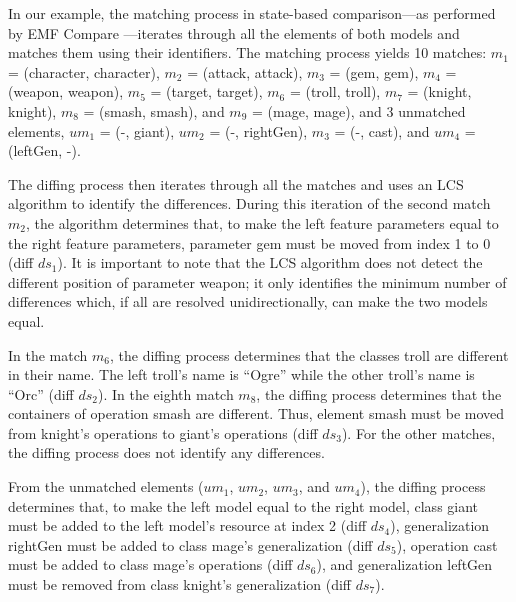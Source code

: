 In our example, the matching process in state-based comparison—as performed by EMF Compare \cite{emfcompare2018developer}—iterates through all the elements of both models and matches them using their identifiers. The matching process yields 10 matches: $m_1$ = (\textsf{character}, \textsf{character}), $m_2$ = (\textsf{attack}, \textsf{attack}), $m_3$ = (\textsf{gem}, \textsf{gem}), $m_4$ = (\textsf{weapon}, \textsf{weapon}), $m_5$ = (\textsf{target}, \textsf{target}), $m_6$ = (\textsf{troll}, \textsf{troll}), $m_7$ = (\textsf{knight}, \textsf{knight}), $m_8$ = (\textsf{smash}, \textsf{smash}), and $m_9$ = (\textsf{mage}, \textsf{mage}), and 3 unmatched elements, $um_1$ = (-, \textsf{giant}), $um_2$ = (-, \textsf{rightGen}), $m_3$ = (-, \textsf{cast}), and $um_4$ = (\textsf{leftGen}, -).

The diffing process then iterates through all the matches and uses an LCS algorithm to identify the differences. During this iteration of the second match $m_2$, the algorithm determines that, to make the left feature \textsf{parameters} equal to the right feature \textsf{parameters}, parameter \textsf{gem} must be moved from index 1 to 0 (diff $ds_1$). It is important to note that the LCS algorithm does not detect the different position of parameter \textsf{weapon}; it only identifies the minimum number of differences which, if all are resolved unidirectionally, can make the two models equal.

In the match $m_6$, the diffing process determines that the classes \textsf{troll} are different in their \textsf{name}. The left \textsf{troll}’s \textsf{name} is “Ogre” while the other \textsf{troll}’s \textsf{name} is “Orc” (diff $ds_2$). In the eighth match $m_8$, the diffing process determines that the containers of operation \textsf{smash} are different. Thus, element \textsf{smash} must be moved from \textsf{knight}’s \textsf{operations} to \textsf{giant}’s \textsf{operations} (diff $ds_3$). For the other matches, the diffing process does not identify any differences.

From the unmatched elements ($um_1$, $um_2$, $um_3$, and $um_4$), the diffing process determines that, to make the left model equal to the right model, class \textsf{giant} must be added to the left model’s resource at index 2 (diff $ds_4$), generalization \textsf{rightGen} must be added to class \textsf{mage}’s \textsf{generalization} (diff $ds_5$), operation \textsf{cast} must be added to class \textsf{mage}’s \textsf{operations} (diff $ds_6$), and generalization \textsf{leftGen} must be removed from class \textsf{knight}’s \textsf{generalization} (diff $ds_7$).

